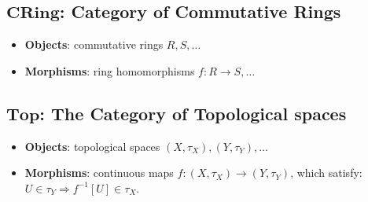 \documentclass[11pt,openany]{article}
\begin{document}
\subsection*{$\mathbf{CRing}$: Category of Commutative Rings}
\begin{itemize}
	\item \textbf{Objects}: commutative rings $R,S,\dots$
	\item \textbf{Morphisms}: ring homomorphisms $f:R\to S, \dots$
\end{itemize}
\subsection*{$\mathbf{Top}$: The Category of Topological spaces}
\begin{itemize}
	\item \textbf{Objects}: topological spaces $(X,\tau_X), (Y,\tau_Y),\dots$
	\item \textbf{Morphisms}: continuous maps $f:(X,\tau_X)\to(Y,\tau_Y)$, which satisfy: $U\in\tau_Y\Rightarrow f^{-1}[U]\in\tau_X$.
\end{itemize}
\end{document}
